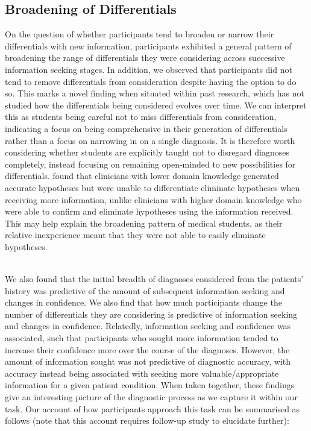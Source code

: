 \documentclass[a4paper, nobind]{templates/ociamthesis}
\begin{document}
\subsection{Broadening of Differentials}\label{broadening-of-differentials}

On the question of whether participants tend to broaden or narrow their differentials with new information, participants exhibited a general pattern of broadening the range of differentials they were considering across successive information seeking stages. In addition, we observed that participants did not tend to remove differentials from consideration despite having the option to do so. This marks a novel finding when situated within past research, which has not studied how the differentials being considered evolves over time. We can interpret this as students being careful not to miss differentials from consideration, indicating a focus on being comprehensive in their generation of differentials rather than a focus on narrowing in on a single diagnosis. It is therefore worth considering whether students are explicitly taught not to disregard diagnoses completely, instead focusing on remaining open-minded to new possibilities for differentials. \autocite{joseph_domain_1990} found that clinicians with lower domain knowledge generated accurate hypotheses but were unable to differentiate eliminate hypotheses when receiving more information, unlike clinicians with higher domain knowledge who were able to confirm and eliminate hypotheses using the information received. This may help explain the broadening pattern of medical students, as their relative inexperience meant that they were not able to easily eliminate hypotheses.\\
\strut \\

We also found that the initial breadth of diagnoses considered from the patients' history was predictive of the amount of subsequent information seeking and changes in confidence. We also find that how much participants change the number of differentials they are considering is predictive of information seeking and changes in confidence. Relatedly, information seeking and confidence was associated, such that participants who sought more information tended to increase their confidence more over the course of the diagnoses. However, the amount of information sought was not predictive of diagnostic accuracy, with accuracy instead being associated with seeking more valuable/appropriate information for a given patient condition. When taken together, these findings give an interesting picture of the diagnostic process as we capture it within our task. Our account of how participants approach this task can be summarised as follows (note that this account requires follow-up study to elucidate further):
\end{document}
